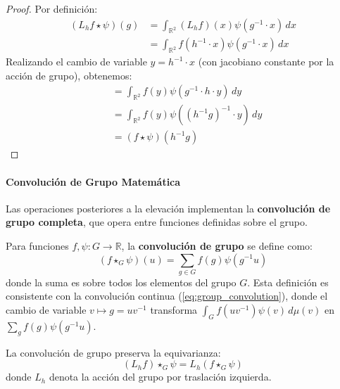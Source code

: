 \begin{proof}
Por definición:
\begin{align}
(L_h f \star \psi)(g) &= \int_{\mathbb{R}^2} (L_h f)(x) \psi(g^{-1} \cdot x) \, dx \\
&= \int_{\mathbb{R}^2} f(h^{-1} \cdot x) \psi(g^{-1} \cdot x) \, dx
\end{align}
Realizando el cambio de variable $y = h^{-1} \cdot x$ (con jacobiano constante por la acción de grupo), obtenemos:
\begin{align}
&= \int_{\mathbb{R}^2} f(y) \psi(g^{-1} \cdot h \cdot y) \, dy \\
&= \int_{\mathbb{R}^2} f(y) \psi((h^{-1}g)^{-1} \cdot y) \, dy \\
&= (f \star \psi)(h^{-1}g)
\end{align}
\end{proof}

\paragraph{Convolución de Grupo Matemática}

Las operaciones posteriores a la elevación implementan la \textbf{convolución de grupo completa}, que opera entre funciones definidas sobre el grupo.

\begin{definition}\label{def:convolucion_grupo}
Para funciones $f, \psi: G \to \mathbb{R}$, la \textbf{convolución de grupo} se define como:
\begin{equation}
(f \star_G \psi)(u) = \sum_{g \in G} f(g) \psi(g^{-1}u)
\end{equation}
donde la suma es sobre todos los elementos del grupo $G$. Esta definición es consistente con la convolución continua (\autoref{eq:group_convolution}), donde el cambio de variable $v \mapsto g = uv^{-1}$ transforma $\int_G f(uv^{-1})\psi(v)\,d\mu(v)$ en $\sum_g f(g)\psi(g^{-1}u)$.
\end{definition}

\begin{theorem}\label{thm:equivarianza_convolucion_grupo}
La convolución de grupo preserva la equivarianza:
\begin{equation}
(L_h f) \star_G \psi = L_h (f \star_G \psi)
\end{equation}
donde $L_h$ denota la acción del grupo por traslación izquierda.
\end{theorem}

